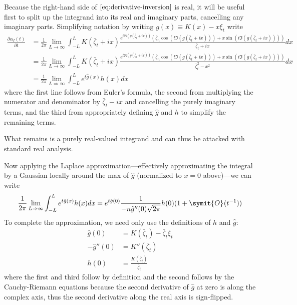 \documentclass{fancyArticle}
\renewcommand{\|}{\,|\,}                    %
\providecommand{\;}{\,;}                    %
\renewcommand{\O}{\symit{O}\:\!}            %
\begin{document}
\begin{appendix}
  Because the right-hand side of $\ref{eq:derivative-inversion}$ is real, it will be useful first to split up the integrand into its real and imaginary parts, cancelling any imaginary parts.
  Simplifying notation by writing $g(x)\equiv K(x)-x\xi_t$ write
  \begin{align*}
    \frac{\partial \alpha_I(t)}{\partial t} &=
                           \frac{1}{2\pi} \lim_{L\rightarrow\infty} \int_{-L}^{L}
                           K(\bar{\zeta}_t+ix)\frac{e^{t\Re (g(\bar{\zeta}_t+ix))}
                           (\bar{\zeta}_n\cos(t\Im (g(\bar{\zeta}_t+ix)))
                           + x \sin(t \Im (g(\bar{\zeta}_t+ix))))}
                           {\bar{\zeta}_t+ix} dx\\
                         &=
                           \frac{1}{2\pi} \lim_{L\rightarrow\infty} \int_{-L}^{L}
                           K(\bar{\zeta}_t+ix)\frac{e^{t\Re (g(\bar{\zeta}_t+ix))}
                           (\bar{\zeta}_n\cos(t\Im (g(\bar{\zeta}_t+ix)))
                           + x \sin(t \Im (g(\bar{\zeta}_t+ix))))}
                           {\bar{\zeta}_t^{2}-x^2} dx\\
                         &=
                           \frac{1}{2\pi}\lim_{L\Rightarrow\infty}\int_{-L}^L e^{t\hat{g}(x)}h(x)dx
  \end{align*}
  where the first line follows from Euler's formula, the second from multiplying the numerator and denominator by $\bar{\zeta}_t-ix$ and cancelling the purely imaginary terms, and the third from appropriately defining $\hat{g}$ and $h$ to simplify the remaining terms.

  What remains is a purely real-valued integrand and can thus be attacked with standard real analysis.

  Now applying the Laplace approximation---effectively approximating the integral by a Gaussian locally around the max of $\hat{g}$ (normalized to $x=0$ above)---we can write\footnotemark
  \begin{align*}
    \frac{1}{2\pi}\lim_{L\Rightarrow\infty}\int_{-L}^L e^{t\hat{g}(x)}h(x)dx
    = e^{t\hat{g}(0)}\frac{1}{-n\hat{g}''(0)\sqrt{2\pi}}h(0)(1+\O(t^{-1}))
  \end{align*}
  To complete the approximation, we need only use the definitions of $h$ and $\hat{g}$:
  \begin{align*}
   \hat{g}(0) &= K(\bar{\zeta}_t)-\bar{\zeta}_t\xi_t\\
    -\hat{g}''(0) &= K''(\bar{\zeta}_t)\\
    h(0) &= \frac{K(\bar{\zeta}_t)}{\bar{\zeta}_t}
  \end{align*}
  where the first and third follow by definition and the second follows by the Cauchy-Riemann equations because the second derivative of $\hat{g}$ at zero is along the complex axis, thus the second derivative along the real axis is sign-flipped.


\end{appendix}
\end{document}
